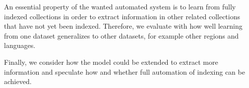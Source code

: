 
An essential property of the wanted automated system is to learn from fully indexed collections in order to extract information in other related collections that have not yet been indexed.
Therefore, we evaluate with how well learning from one dataset generalizes to other datasets, for example other regions and languages.

Finally, we consider how the model could be extended to extract more information and speculate how and whether full automation of indexing can be achieved.

